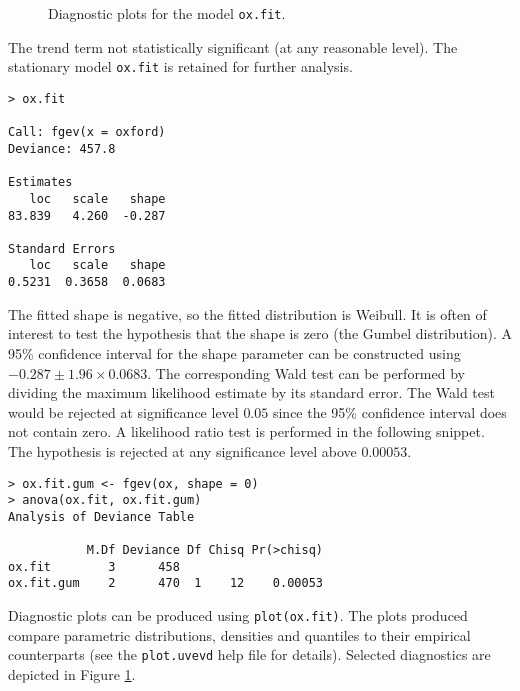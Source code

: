 \documentclass[11pt,a4paper]{article}
\begin{document}
\begin{figure}
\begin{center}
\vspace{-1.5cm}
\hspace{0cm} 
\hspace{0cm}
\end{center} 
\caption{Diagnostic plots for the model \texttt{ox.fit}.}
\label{oxdiag}
\end{figure}

The trend term not statistically significant (at any reasonable level). 
The stationary model \verb+ox.fit+ is retained for further analysis.

\begin{verbatim}
> ox.fit

Call: fgev(x = oxford) 
Deviance: 457.8 

Estimates
   loc   scale   shape  
83.839   4.260  -0.287  

Standard Errors
   loc   scale   shape  
0.5231  0.3658  0.0683 
\end{verbatim}

The fitted shape is negative, so the fitted distribution is Weibull.
It is often of interest to test the hypothesis that the shape is zero (the Gumbel distribution).
A 95\% confidence interval for the shape parameter can be constructed using $-0.287 \pm 1.96 \times 0.0683$.
The corresponding Wald test can be performed by dividing the maximum likelihood estimate by its standard error.
The Wald test would be rejected at significance level $0.05$ since the 95\% confidence interval does not contain zero.
A likelihood ratio test is performed in the following snippet.
The hypothesis is rejected at any significance level above $0.00053$.

\begin{verbatim}
> ox.fit.gum <- fgev(ox, shape = 0)
> anova(ox.fit, ox.fit.gum)
Analysis of Deviance Table

           M.Df Deviance Df Chisq Pr(>chisq)
ox.fit        3      458
ox.fit.gum    2      470  1    12    0.00053 
\end{verbatim}

Diagnostic plots can be produced using \verb+plot(ox.fit)+.
The plots produced compare parametric distributions, densities and quantiles to their empirical counterparts (see the \verb+plot.uvevd+ help file for details). Selected diagnostics are depicted in Figure \ref{oxdiag}.
\end{document}
